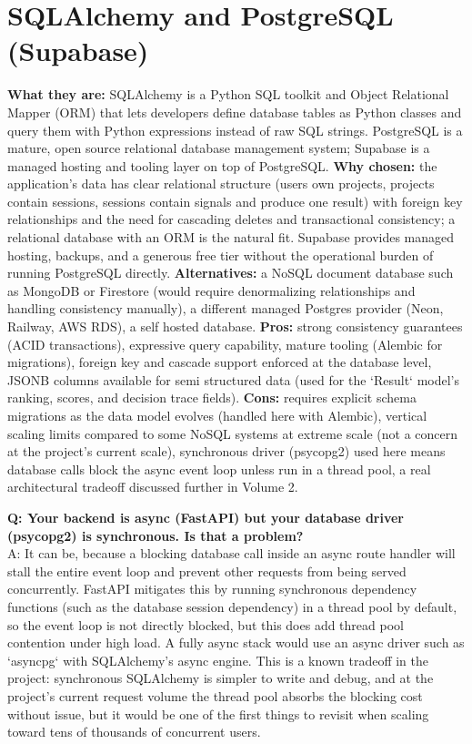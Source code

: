 \documentclass[11pt,a4paper]{report}
\begin{document}
\section{SQLAlchemy and PostgreSQL (Supabase)}
\textbf{What they are:} SQLAlchemy is a Python SQL toolkit and Object Relational Mapper (ORM) that lets developers define database tables as Python classes and query them with Python expressions instead of raw SQL strings. PostgreSQL is a mature, open source relational database management system; Supabase is a managed hosting and tooling layer on top of PostgreSQL.
\textbf{Why chosen:} the application's data has clear relational structure (users own projects, projects contain sessions, sessions contain signals and produce one result) with foreign key relationships and the need for cascading deletes and transactional consistency; a relational database with an ORM is the natural fit. Supabase provides managed hosting, backups, and a generous free tier without the operational burden of running PostgreSQL directly.
\textbf{Alternatives:} a NoSQL document database such as MongoDB or Firestore (would require denormalizing relationships and handling consistency manually), a different managed Postgres provider (Neon, Railway, AWS RDS), a self hosted database.
\textbf{Pros:} strong consistency guarantees (ACID transactions), expressive query capability, mature tooling (Alembic for migrations), foreign key and cascade support enforced at the database level, JSONB columns available for semi structured data (used for the `Result` model's ranking, scores, and decision trace fields).
\textbf{Cons:} requires explicit schema migrations as the data model evolves (handled here with Alembic), vertical scaling limits compared to some NoSQL systems at extreme scale (not a concern at the project's current scale), synchronous driver (psycopg2) used here means database calls block the async event loop unless run in a thread pool, a real architectural tradeoff discussed further in Volume 2.

\begin{qabox}
\textbf{Q: Your backend is async (FastAPI) but your database driver (psycopg2) is synchronous. Is that a problem?} \\
A: It can be, because a blocking database call inside an async route handler will stall the entire event loop and prevent other requests from being served concurrently. FastAPI mitigates this by running synchronous dependency functions (such as the database session dependency) in a thread pool by default, so the event loop is not directly blocked, but this does add thread pool contention under high load. A fully async stack would use an async driver such as `asyncpg` with SQLAlchemy's async engine. This is a known tradeoff in the project: synchronous SQLAlchemy is simpler to write and debug, and at the project's current request volume the thread pool absorbs the blocking cost without issue, but it would be one of the first things to revisit when scaling toward tens of thousands of concurrent users.
\end{qabox}
\end{document}
